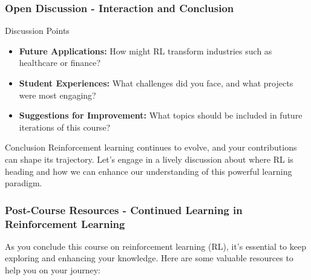 \documentclass[aspectratio=169]{beamer}
\begin{document}
\begin{frame}[fragile]
    \frametitle{Open Discussion - Interaction and Conclusion}
    \begin{block}{Discussion Points}
        \begin{itemize}
            \item \textbf{Future Applications:} How might RL transform industries such as healthcare or finance?
            \item \textbf{Student Experiences:} What challenges did you face, and what projects were most engaging?
            \item \textbf{Suggestions for Improvement:} What topics should be included in future iterations of this course?
        \end{itemize}
    \end{block}
    
    \begin{block}{Conclusion}
        Reinforcement learning continues to evolve, and your contributions can shape its trajectory. Let’s engage in a lively discussion about where RL is heading and how we can enhance our understanding of this powerful learning paradigm.
    \end{block}
\end{frame}

\begin{frame}[fragile]
    \frametitle{Post-Course Resources - Continued Learning in Reinforcement Learning}
    As you conclude this course on reinforcement learning (RL), it's essential to keep exploring and enhancing your knowledge. Here are some valuable resources to help you on your journey:
\end{frame}
\end{document}
